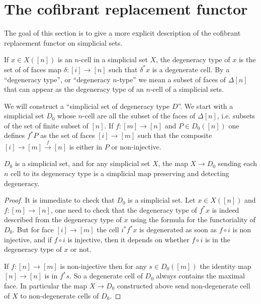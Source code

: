 \documentclass[reqno,10pt,a4paper,oneside,draft]{amsart}
\begin{document}
\section{The cofibrant replacement functor}

The goal of this section is to give a more explicit description of the cofibrant replacement functor on simplicial sets.


\begin{definition}
If $x \in X([n])$ is an $n$-cell in a simplicial set $X$, the degeneracy type of $x$ is the set of of faces map $\delta:[i] \rightarrow [n]$ such that $\delta^* x$ is a degenerate cell. 
By a ``degeneracy type'', or ``degeneracy $n$-type'' we mean a subset of faces of $\Delta[n]$ that can appear as the degeneracy type of an $n$-cell of a simplicial sets.
\end{definition}

We will construct a ``simplicial set of degeneracy type $D$''. We start with a simplicial set $D_0$ whose $n$-cell are all the subset of the faces of $\Delta[n]$, i.e. subsets of the set of finite subset of $[n]$. If $f : [m] \rightarrow [n]$ and $P \in D_0([n])$ one defines $f^* P$ as the set of faces  $[i] \rightarrow [m]$ such that the composite $[i] \rightarrow [m] \overset{f}{\rightarrow} [n]$ is either in $P$ or non-injective.

\begin{lemma}
$D_0$ is a simplicial set, and for any simplicial set $X$, the map $X \rightarrow D_0$ sending each $n$ cell to its degeneracy type is a simplicial map preserving and detecting degeneracy.
\end{lemma}

\begin{proof}
It is immediate to check that $D_0$ is a simplicial set. Let $x \in X([n])$ and $f:[m] \rightarrow [n]$, one need to check that the degeneracy type of $f^* x$ is indeed described from the degeneracy type of $x$ using the formula for the functoriality of $D_0$. But for face $[i] \rightarrow [m]$ the cell $i^* f^* x$ is degenerated as soon as $f \circ i$ is non injective, and if $f\circ i$ is injective, then it depends on whether $f \circ i$ is in the degeneracy type of $x$ or not.

If $f:[n] \rightarrow [m]$ is non-injective then for any $s \in D_0([m])$ the identity map $[n] \rightarrow [n]$ is in $f^* s$. So a degenerate cell of $D_0$ always contains the maximal face. In particular the map $X \rightarrow D_0$ constructed above send non-degenerate cell of $X$ to non-degenerate cells of $D_0$.

\end{proof}
\end{document}
